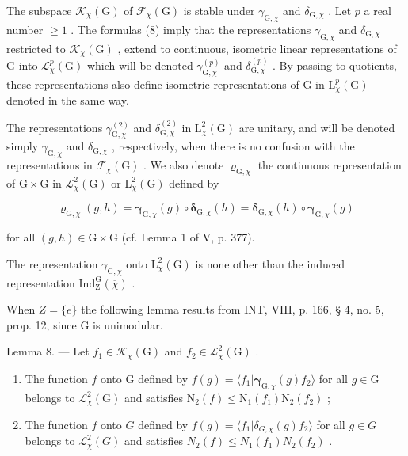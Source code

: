  The subspace \(\mathcal{K}_{\chi}(\mathrm{G})\) of \(\mathcal{F}_{\chi}(\mathrm{G})\) is stable under \(\gamma_{\mathrm{G},\chi}\) and \(\delta_{\mathrm{G},\chi}\) . Let \(p\) a real number \(\geqslant 1\) . The formulas (8) imply that the representations \(\gamma_{\mathrm{G},\chi}\) and \(\delta_{\mathrm{G},\chi}\) restricted to \(\mathcal{K}_{\chi}(\mathrm{G})\) , extend to continuous, isometric linear representations of G into \(\mathcal{L}_{\chi}^{p}(\mathrm{G})\) which will be denoted \(\gamma_{\mathrm{G},\chi}^{(p)}\) and \(\delta_{\mathrm{G},\chi}^{(p)}\) . By passing to quotients, these representations also define isometric representations of G in \(\mathrm{L}_{\chi}^{p}(\mathrm{G})\) denoted in the same way.

 The representations \(\gamma_{\mathrm{G},\chi}^{(2)}\) and \(\delta_{\mathrm{G},\chi}^{(2)}\) in \(\mathrm{L}_{\chi}^{2}(\mathrm{G})\) are unitary, and will be denoted simply \(\gamma_{\mathrm{G},\chi}\) and \(\delta_{\mathrm{G},\chi}\) , respectively, when there is no confusion with the representations in \(\mathcal{F}_{\chi}(\mathrm{G})\) . We also denote \(\varrho_{\mathrm{G},\chi}\) the continuous representation of \(\mathrm{G} \times \mathrm{G}\) in \(\mathcal{L}_{\chi}^{2}(\mathrm{G})\) or \(\mathrm{L}_{\chi}^{2}(\mathrm{G})\) defined by

\[
\pmb {\varrho} _ {\mathrm{G}, \chi} (g, h) = \pmb {\gamma} _ {\mathrm{G}, \chi} (g) \circ \pmb {\delta} _ {\mathrm{G}, \chi} (h) = \pmb {\delta} _ {\mathrm{G}, \chi} (h) \circ \pmb {\gamma} _ {\mathrm{G}, \chi} (g)
\]

for all \((g,h)\in \mathrm{G}\times \mathrm{G}\) (cf. Lemma 1 of V, p. 377).

The representation \(\gamma_{\mathrm{G},\chi}\) onto \(\mathrm{L}_{\chi}^{2}(\mathrm{G})\) is none other than the induced representation \(\mathrm{Ind}_{\mathrm{Z}}^{\mathrm{G}}(\overline{\chi})\) .

When \(Z = \{e\}\) the following lemma results from INT, VIII, p. 166, § 4, no. 5, prop. 12, since G is unimodular.

Lemma 8. --- Let \(f_1 \in \mathcal{K}_\chi(\mathrm{G})\) and \(f_2 \in \mathcal{L}_\chi^2(\mathrm{G})\) .

\begin{enumerate}
\def\labelenumi{\alph{enumi})}
\item
  The function \(f\) onto \(\mathrm{G}\) defined by \(f(g) = \langle f_1 | \boldsymbol{\gamma}_{\mathrm{G},\chi}(g)f_2 \rangle\) for all \(g \in \mathrm{G}\) belongs to \(\mathcal{L}_{\chi}^{2}(\mathrm{G})\) and satisfies \(\mathrm{N}_2(f) \leqslant \mathrm{N}_1(f_1)\mathrm{N}_2(f_2)\) ;
\item
  The function \(f\) onto \(G\) defined by \(f(g) = \langle f_1 | \delta_{G,\chi}(g)f_2 \rangle\) for all \(g \in G\) belongs to \(\mathcal{L}_{\chi}^{2}(G)\) and satisfies \(N_2(f) \leqslant N_1(f_1)N_2(f_2)\) .
\end{enumerate}

